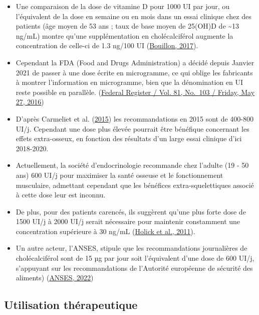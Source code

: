 \documentclass[
  letterpaper,
  DIV=11,
  numbers=noendperiod]{scrartcl}
\begin{document}
\begin{itemize}
\item
  Une comparaison de la dose de vitamine D pour 1000 UI par jour, ou
  l'équivalent de la dose en semaine ou en mois dans un essai clinique
  chez des patients (âge moyen de 53 ans ; taux de base moyen de 25(OH)D
  de \textasciitilde13 ng/mL) montre qu'une supplémentation en
  cholécalciférol augmente la concentration de celle-ci de 1.3 ng/100 UI
  (\protect\hyperlink{ref-Bouillon.2017}{Bouillon, 2017}).
\item
  Cependant la FDA (Food and Drugs Administration) a décidé depuis
  Janvier 2021 de passer à une dose écrite en microgramme, ce qui oblige
  les fabricants à montrer l'information en microgramme, bien que la
  dénomination en UI reste possible en parallèle.
  (\href{https://www.govinfo.gov/content/pkg/FR-2016-05-27/pdf/2016-11867.pdf}{Federal
  Register / Vol. 81, No.~103 / Friday, May 27, 2016})
\item
  D'après Carmeliet et al.
  (\protect\hyperlink{ref-Carmeliet.2015}{2015}) les recommandations en
  2015 sont de 400-800 UI/j. Cependant une dose plus élevée pourrait
  être bénéfique concernant les effets extra-osseux, en fonction des
  résultats d'un large essai clinique d'ici 2018-2020.
\item
  Actuellement, la société d'endocrinologie recommande chez l'adulte (19
  - 50 ans) 600 UI/j pour maximiser la santé osseuse et le
  fonctionnement musculaire, admettant cependant que les bénéfices
  extra-squelettiques associé à cette dose leur est inconnu.
\item
  De plus, pour des patients carencés, ils suggèrent qu'une plus forte
  dose de 1500 UI/j à 2000 UI/j serait nécessaire pour maintenir
  constamment une concentration supérieure à 30 ng/mL
  (\protect\hyperlink{ref-Holick.2011}{Holick et al., 2011}).
\item
  Un autre acteur, l'ANSES, stipule que les recommandations journalières
  de cholécalciférol sont de 15 µg par jour soit l'équivalent d'une dose
  de 600 UI/j, s'appuyant sur les recommandations de l'Autorité
  européenne de sécurité des aliments)
  (\protect\hyperlink{ref-ANSES.2022}{ANSES, 2022})
\end{itemize}

\hypertarget{utilisation-thuxe9rapeutique}{%
\subsection{Utilisation
thérapeutique}\label{utilisation-thuxe9rapeutique}}
\end{document}
